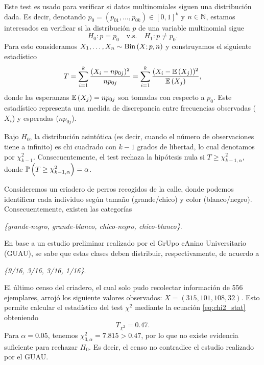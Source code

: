 Este test es usado para verificar si datos multinomiales siguen una distribución dada. Es decir, denotando $p_0 = (p_{01},\ldots,p_{0k})\in[0,1]^k$ y $n\in{\mathbb N}$, estamos interesados en verificar si la distribución $p$ de una variable multinomial sigue
	\begin{equation}
		H_0:p=p_0\quad \text{v.s.}\quad H_1:p\neq p_0.
	\end{equation}
Para esto consideramos $X_1,\ldots,X_n\sim\text{Bin}\left(X;p,n\right)$ y construyamos el siguiente estadístico
\begin{equation}
	\label{eq:chi2_stat}
	T = \sum_{i=1}^k \frac{(X_i - n p_{0j})^2}{n p_{0j}} = \sum_{i=1}^k \frac{(X_i - \mathbb{E} \left(X_j\right))^2}{\mathbb{E} \left(X_j\right)},
\end{equation}
donde las esperanzas $\mathbb{E} \left(X_j\right) = np_{0j}$ son tomadas con respecto a $p_0$. Este estadístico representa una medida de discrepancia entre frecuencias observadas ($X_i$) y esperadas ($np_{0j}$).

Bajo $H_0$, la distribución asintótica (es decir, cuando el número de observaciones tiene a infinito) es chi cuadrado con $k-1$ grados de libertad, lo cual denotamos por $\chi^2_{k-1}$. Consecuentemente, el test rechaza la hipótesis nula si $T\geq \chi^2_{k-1,\alpha}$, donde $\mathbb{P} \left(T\geq \chi^2_{k-1,\alpha}\right) = \alpha$.

\begin{example}
	Consideremos un criadero de perros recogidos de la calle, donde podemos identificar cada individuo según tamaño (grande/chico) y color (blanco/negro). Consecuentemente, existen las categorías \\
	\centerline{\emph{\{grande-negro, grande-blanco, chico-negro, chico-blanco\}}.}
	En base a un estudio preliminar realizado por el GrUpo cAnino Universitario (GUAU), se sabe que estas clases deben distribuir, respectivamente, de acuerdo a \\
	\centerline{\emph{\{9/16, 3/16, 3/16, 1/16\}}.}
	El último censo del criadero, el cual solo pudo recolectar información de 556 ejemplares, arrojó los siguiente valores observados: $X=(315, 101, 108,32)$. Esto permite calcular el estadístico del test $\chi^2$ mediante la ecuación \eqref{eq:chi2_stat} obteniendo
	\begin{equation}
		T_{\chi^2} = 0.47.
	\end{equation}
	Para $\alpha=0.05$, tenemos $\chi^2_{3,\alpha} = 7.815>0.47$, por lo que no existe evidencia suficiente para rechazar $H_0$. Es decir, el censo no contradice el estudio realizado por el GUAU. 
\end{example}

